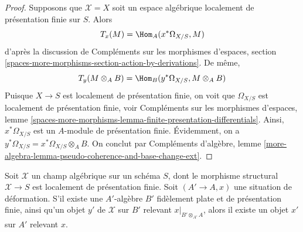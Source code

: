 \begin{proof}
\medskip\noindent
Supposons que $\mathcal{X} = X$ soit un espace algébrique localement de
présentation finie sur $S$. Alors
$$
T_x(M) = \Hom_A(x^*\Omega_{X/S}, M)
$$
d'après la discussion de Compléments sur les morphismes d'espaces, section
\ref{spaces-more-morphisms-section-action-by-derivations}.
De même,
$$
T_y(M \otimes_A B) = \Hom_B(y^*\Omega_{X/S}, M \otimes_A B)
$$
Puisque $X \to S$ est localement de présentation finie, on voit que
$\Omega_{X/S}$ est localement de présentation finie, voir
Compléments sur les morphismes d'espaces, lemme
\ref{spaces-more-morphisms-lemma-finite-presentation-differentials}.
Ainsi, $x^*\Omega_{X/S}$ est un $A$-module de présentation finie.
Évidemment, on a $y^*\Omega_{X/S} = x^*\Omega_{X/S} \otimes_A B$.
On conclut par Compléments d'algèbre, lemme
\ref{more-algebra-lemma-pseudo-coherence-and-base-change-ext}.
\end{proof}

\begin{lemma}
\label{lemma-local-lift-enough}
Soit $\mathcal{X}$ un champ algébrique sur un schéma $S$, dont le
morphisme structural $\mathcal{X} \to S$ est localement de présentation finie.
Soit $(A' \to A, x)$ une situation de déformation. S'il existe une
$A'$-algèbre $B'$ fidèlement plate et de présentation finie, ainsi qu'un
objet $y'$ de $\mathcal{X}$ sur $B'$ relevant $x|_{B' \otimes_{A'} A}$,
alors il existe un objet $x'$ sur $A'$ relevant $x$.
\end{lemma}

